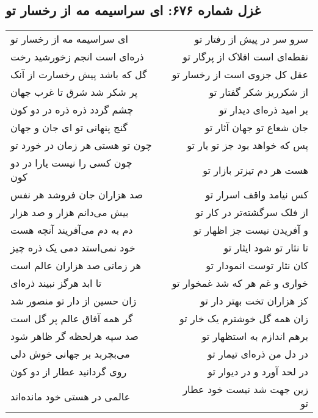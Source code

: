 \begin{center}
\section*{غزل شماره ۶۷۶: ای سراسیمه مه از رخسار تو}
\label{sec:676}
\begin{longtable}{l p{0.5cm} r}
ای سراسیمه مه از رخسار تو
&&
سرو سر در پیش از رفتار تو
\\
ذره‌ای است انجم زخورشید رخت
&&
نقطه‌ای است افلاک از پرگار تو
\\
گل که باشد پیش رخسارت از آنک
&&
عقل کل جزوی است از رخسار تو
\\
پر شکر شد شرق تا غرب جهان
&&
از شکرریز شکر گفتار تو
\\
چشم گردد ذره ذره در دو کون
&&
بر امید ذره‌ای دیدار تو
\\
گنج پنهانی تو ای جان و جهان
&&
جان شعاع تو جهان آثار تو
\\
چون تو هستی هر زمان در خورد تو
&&
پس که خواهد بود جز تو یار تو
\\
چون کسی را نیست یارا در دو کون
&&
هست هر دم تیزتر بازار تو
\\
صد هزاران جان فروشد هر نفس
&&
کس نیامد واقف اسرار تو
\\
بیش می‌دانم هزار و صد هزار
&&
از فلک سرگشته‌تر در کار تو
\\
دم به دم می‌آفریند آنچه هست
&&
و آفریدن نیست جز اظهار تو
\\
خود نمی‌استد دمی یک ذره چیز
&&
تا نثار تو شود ایثار تو
\\
هر زمانی صد هزاران عالم است
&&
کان نثار توست انمودار تو
\\
تا ابد هرگز نبیند ذره‌ای
&&
خواری و غم هر که شد غمخوار تو
\\
زان حسین از دار تو منصور شد
&&
کز هزاران تخت بهتر دار تو
\\
گر همه آفاق عالم پر گل است
&&
زان همه گل خوشترم یک خار تو
\\
صد سپه هرلحظه گر ظاهر شود
&&
برهم اندازم به استظهار تو
\\
می‌بچربد بر جهانی خوش دلی
&&
در دل من ذره‌ای تیمار تو
\\
روی گردانید عطار از دو کون
&&
در لحد آورد و در دیوار تو
\\
عالمی در هستی خود مانده‌اند
&&
زین جهت شد نیست خود عطار تو
\\
\end{longtable}
\end{center}
